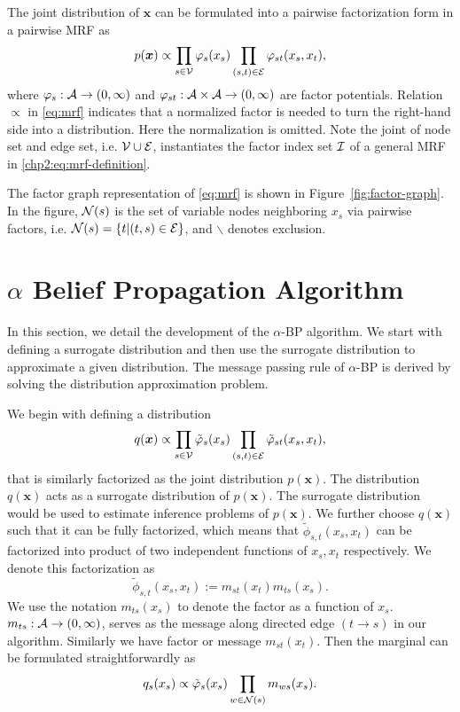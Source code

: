 The joint distribution of $\bm{x}$ can be formulated into a pairwise factorization form in a pairwise MRF as
\begin{equation}\label{eq:mrf}
  p(\bm{x}) \propto \prod_{{s\in \mathcal{V}}} \varphi_s(x_s) \prod_{(s,t) \in \mathcal{E}} \varphi_{st}(x_s, x_t),
\end{equation}
where $\varphi_{s}: \mathcal{A} \rightarrow (0, \infty)$ and $\varphi_{st}: \mathcal{A} \times \mathcal{A} \rightarrow (0, \infty)$ are factor potentials. Relation $\propto$ in \eqref{eq:mrf} indicates that a normalized factor is needed to turn the right-hand side into a distribution. Here the normalization is omitted. Note the joint of node set and edge set, i.e. $\mathcal{V} \cup \mathcal{E}$, instantiates the factor index set $\mathcal{I}$ of a general MRF in \eqref{chp2:eq:mrf-definition}.

The factor graph representation of \eqref{eq:mrf} is shown in
Figure~\ref{fig:factor-graph}. In the figure, $\mathcal{N}(s)$ is the set of variable nodes neighboring $x_s$ via
pairwise factors, i.e. $\mathcal{N}(s) = \left\{ t|(t,s) \in \mathcal{E} \right\}$, and $\backslash$ denotes exclusion.

\section{$\alpha$ Belief Propagation Algorithm}\label{sec:alpha-bp-factor-refine}
In this section, we detail the development of the $\alpha$-BP algorithm. We start with defining a surrogate distribution and then use the surrogate distribution to approximate a given distribution. The message passing rule of $\alpha$-BP is derived by solving the distribution approximation problem.

We begin with defining a distribution
\begin{equation}
  q(\bm{x}) \propto \prod_{{s\in \mathcal{V}}} \tilde{\varphi}_s(x_s) \prod_{(s,t) \in \mathcal{E}} \tilde{\varphi}_{st}(x_s, x_t),
\end{equation}
that is similarly factorized as the joint distribution $p(\bm{x})$. The distribution $q(\bm{x})$ acts as a surrogate distribution of $p(\bm{x})$. The surrogate distribution would be used to estimate inference problems of $p(\bm{x})$. We further choose $q(\bm{x})$ such that it can be fully factorized, which means that $\tilde{\phi}_{s,t}(x_s, x_t)$ can be factorized into product of two independent functions of $x_s, x_t$ respectively. We denote this factorization as
\begin{equation}
  \tilde{\phi}_{s,t}(x_s, x_t) := m_{st}(x_t) m_{ts}(x_s).
\end{equation}
We use the notation $m_{ts}(x_s)$ to denote the factor as a function of $x_s$. $m_{ts}: \mathcal{A} \rightarrow (0, \infty)$, serves as the message along directed edge $(t \rightarrow s)$ in our algorithm. Similarly we have factor or message $m_{st}(x_t)$. Then the marginal can be formulated straightforwardly as
\begin{equation}
  q_s(x_s) \propto \tilde{\varphi}_s(x_s) \prod_{w\in \mathcal{N}(s)} m_{ws}(x_s).
\end{equation}

